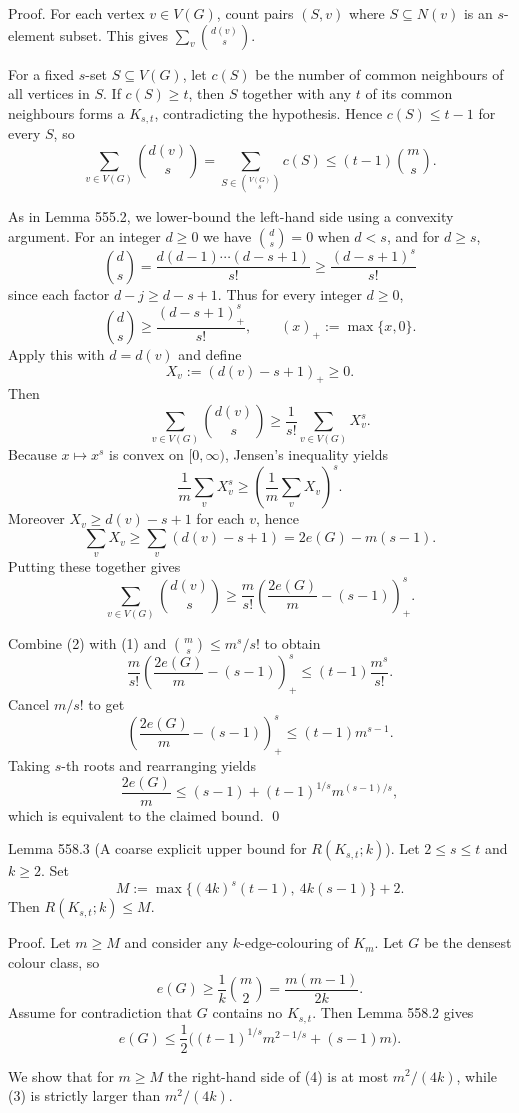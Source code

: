 Proof.
For each vertex $v\in V(G)$, count pairs $(S,v)$ where $S\subseteq N(v)$ is an $s$-element subset.
This gives $\sum_v \binom{d(v)}{s}$.

For a fixed $s$-set $S\subseteq V(G)$, let $c(S)$ be the number of common neighbours of all vertices in $S$.
If $c(S)\ge t$, then $S$ together with any $t$ of its common neighbours forms a $K_{s,t}$, contradicting the hypothesis.
Hence $c(S)\le t-1$ for every $S$, so
\[
\sum_{v\in V(G)} \binom{d(v)}{s}=
\sum_{S\in \binom{V(G)}{s}} c(S)
\le (t-1)\binom{m}{s}.
\tag{1}
\]

As in Lemma 555.2, we lower-bound the left-hand side using a convexity argument.
For an integer $d\ge 0$ we have $\binom{d}{s}=0$ when $d<s$, and for $d\ge s$,
\[
\binom{d}{s}=\frac{d(d-1)\cdots(d-s+1)}{s!}\ge \frac{(d-s+1)^s}{s!}
\]
since each factor $d-j\ge d-s+1$.
Thus for every integer $d\ge 0$,
\[
\binom{d}{s}\ge \frac{(d-s+1)_+^s}{s!},\qquad (x)_+:=\max\{x,0\}.
\]
Apply this with $d=d(v)$ and define
\[
X_v:=(d(v)-s+1)_+\ge 0.
\]
Then
\[
\sum_{v\in V(G)}\binom{d(v)}{s}\ge \frac{1}{s!}\sum_{v\in V(G)} X_v^s.
\]
Because $x\mapsto x^s$ is convex on $[0,\infty)$, Jensen's inequality yields
\[
\frac{1}{m}\sum_v X_v^s\ge \left(\frac{1}{m}\sum_v X_v\right)^s.
\]
Moreover $X_v\ge d(v)-s+1$ for each $v$, hence
\[
\sum_v X_v\ge \sum_v (d(v)-s+1)=2e(G)-m(s-1).
\]
Putting these together gives
\[
\sum_{v\in V(G)} \binom{d(v)}{s}
\ge \frac{m}{s!}\left(\frac{2e(G)}{m}-(s-1)\right)_+^s.
\tag{2}
\]

Combine (2) with (1) and $\binom{m}{s}\le m^s/s!$ to obtain
\[
\frac{m}{s!}\left(\frac{2e(G)}{m}-(s-1)\right)_+^s\le (t-1)\frac{m^s}{s!}.
\]
Cancel $m/s!$ to get
\[
\left(\frac{2e(G)}{m}-(s-1)\right)_+^s\le (t-1)m^{s-1}.
\]
Taking $s$-th roots and rearranging yields
\[
\frac{2e(G)}{m}\le (s-1)+(t-1)^{1/s}m^{(s-1)/s},
\]
which is equivalent to the claimed bound.
\qed

Lemma 558.3 (A coarse explicit upper bound for $R(K_{s,t};k)$).
Let $2\le s\le t$ and $k\ge 2$.
Set
\[
M:=\max\{(4k)^s(t-1),\ 4k(s-1)\}+2.
\]
Then $R(K_{s,t};k)\le M$.

Proof.
Let $m\ge M$ and consider any $k$-edge-colouring of $K_m$.
Let $G$ be the densest colour class, so
\[
e(G)\ge \frac{1}{k}\binom{m}{2}=\frac{m(m-1)}{2k}.
\tag{3}
\]
Assume for contradiction that $G$ contains no $K_{s,t}$.
Then Lemma 558.2 gives
\[
e(G)\le \frac12\Big((t-1)^{1/s}m^{2-1/s}+(s-1)m\Big).
\tag{4}
\]

We show that for $m\ge M$ the right-hand side of (4) is at most $m^2/(4k)$, while (3) is strictly larger than $m^2/(4k)$.

